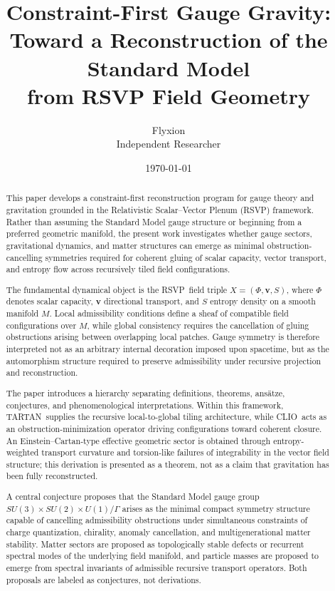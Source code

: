 \documentclass[12pt,a4paper]{article}
\title{
\large\textbf{%
Constraint-First Gauge Gravity:\\
Toward a Reconstruction of the Standard Model\\
from RSVP Field Geometry}
}
\author{%
Flyxion\\[0.4em]
\small Independent Researcher}
\date{\today}
\newcommand{\RSVP}{\textrm{RSVP}}
\newcommand{\CLIO}{\textrm{CLIO}}
\newcommand{\TARTAN}{\textrm{TARTAN}}
\begin{document}
\maketitle

\begin{abstract}
This paper develops a constraint-first reconstruction program for gauge theory
and gravitation grounded in the Relativistic Scalar--Vector Plenum (\RSVP)
framework. Rather than assuming the Standard Model gauge structure or beginning
from a preferred geometric manifold, the present work investigates whether gauge
sectors, gravitational dynamics, and matter structures can emerge as minimal
obstruction-cancelling symmetries required for coherent gluing of scalar
capacity, vector transport, and entropy flow across recursively tiled field
configurations.

The fundamental dynamical object is the \RSVP\ field triple
$X=(\Phi,\mathbf{v},S)$,
where $\Phi$ denotes scalar capacity, $\mathbf{v}$ directional transport, and
$S$ entropy density on a smooth manifold $M$. Local admissibility conditions
define a sheaf of compatible field configurations over $M$, while global
consistency requires the cancellation of gluing obstructions arising between
overlapping local patches. Gauge symmetry is therefore interpreted not as an
arbitrary internal decoration imposed upon spacetime, but as the automorphism
structure required to preserve admissibility under recursive projection and
reconstruction.

The paper introduces a hierarchy separating definitions, theorems, ans\"{a}tze,
conjectures, and phenomenological interpretations. Within this framework,
\TARTAN\ supplies the recursive local-to-global tiling architecture, while
\CLIO\ acts as an obstruction-minimization operator driving configurations
toward coherent closure. An Einstein--Cartan-type effective geometric sector is
obtained through entropy-weighted transport curvature and torsion-like failures
of integrability in the vector field structure; this derivation is presented as
a theorem, not as a claim that gravitation has been fully reconstructed.

A central conjecture proposes that the Standard Model gauge group
$SU(3)\times SU(2)\times U(1)/\Gamma$
arises as the minimal compact symmetry structure capable of cancelling
admissibility obstructions under simultaneous constraints of charge
quantization, chirality, anomaly cancellation, and multigenerational matter
stability. Matter sectors are proposed as topologically stable defects or
recurrent spectral modes of the underlying field manifold, and particle masses
are proposed to emerge from spectral invariants of admissible recursive
transport operators. Both proposals are labeled as conjectures, not derivations.


\end{abstract}
\end{document}

